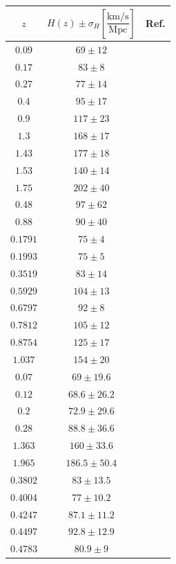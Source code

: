 \begin{ruledtabular}
\begin{tabular}{ccc}

$z$ & $H\left(z\right)\pm\sigma_{H}\left[\dfrac{\mathrm{km/s}}{\mathrm{Mpc}}\right]$ & Ref.\tabularnewline

\hline 
$0.09$ & $69\pm12$ & \multirow{9}{*}{\cite{CC1}}\tabularnewline
$0.17$ & $83\pm8$ & \tabularnewline
$0.27$ & $77\pm14$ & \tabularnewline
$0.4$ & $95\pm17$ & \tabularnewline
$0.9$ & $117\pm23$ & \tabularnewline
$1.3$ & $168\pm17$ & \tabularnewline
$1.43$ & $177\pm18$ & \tabularnewline
$1.53$ & $140\pm14$ & \tabularnewline
$1.75$ & $202\pm40$ & \tabularnewline
\hline
$0.48$ & $97\pm62$ & \multirow{2}{*}{\cite{CC2}}\tabularnewline
$0.88$ & $90\pm40$ & \tabularnewline
\hline
$0.1791$ & $75\pm4$ & \multirow{8}{*}{\cite{CC3}}\tabularnewline
$0.1993$ & $75\pm5$ & \tabularnewline
$0.3519$ & $83\pm14$ & \tabularnewline
$0.5929$ & $104\pm13$ & \tabularnewline
$0.6797$ & $92\pm8$ & \tabularnewline
$0.7812$ & $105\pm12$ & \tabularnewline
$0.8754$ & $125\pm17$ & \tabularnewline
$1.037$ & $154\pm20$ & \tabularnewline
\hline
$0.07$ & $69\pm19.6$ & \multirow{4}{*}{\cite{CC4}}\tabularnewline
$0.12$ & $68.6\pm26.2$ & \tabularnewline
$0.2$ & $72.9\pm29.6$ & \tabularnewline
$0.28$ & $88.8\pm36.6$ & \tabularnewline
\hline
$1.363$ & $160\pm33.6$  & \multirow{2}{*}{\cite{CC5}}\tabularnewline
$1.965$ & $186.5\pm50.4$ & \tabularnewline
\hline
$0.3802$ & $83\pm13.5$ & \multirow{5}{*}{\cite{CC6}}\tabularnewline
$0.4004$ & $77\pm10.2$ & \tabularnewline
$0.4247$ & $87.1\pm11.2$ & \tabularnewline
$0.4497$ & $92.8\pm12.9$  & \tabularnewline
$0.4783$ & $80.9\pm9$ & \tabularnewline
\end{tabular}
\end{ruledtabular}